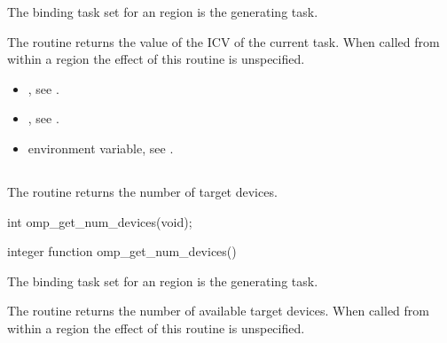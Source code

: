 \binding
The binding task set for an  region is the generating 
task. 

\effect
The  routine returns the value of the  
ICV of the current task. When called from within a  region the effect of this 
routine is unspecified.

\crossreferences
\begin{itemize}
\item {}, see 
.

\item {}, see 
.

\item {} environment variable, see 
. 
\end{itemize}











\subsection{}
\label{subsec:omp_get_num_devices}
\summary
The  routine returns the number of target devices.

\format
\begin{ccppspecific}
\begin{boxedcode}
int omp\_get\_num\_devices(void);
\end{boxedcode}
\end{ccppspecific}

\begin{fortranspecific}
\begin{boxedcode}
integer function omp\_get\_num\_devices()
\end{boxedcode}
\end{fortranspecific}

\binding
The binding task set for an  region is the generating task.

\effect
The  routine returns the number of available target devices. 
When called from within a  region the effect of this routine is unspecified.

